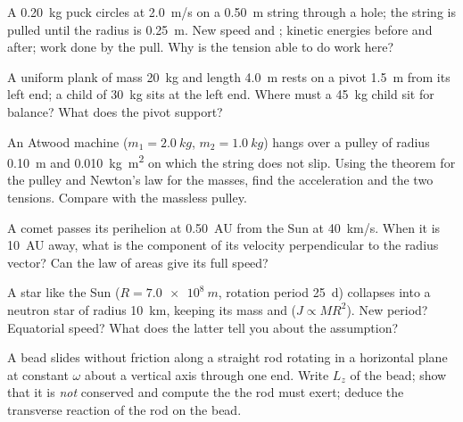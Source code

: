 \begin{exercise}[$\star\star$]\label{exo:b1:angular-momentum:7}
A \qty{0.20}{kg} puck circles at \qty{2.0}{m/s} on a \qty{0.50}{m} string
through a hole; the string is pulled until the radius is \qty{0.25}{m}.
New speed and ; kinetic energies before and after; work
done by the pull. Why is the tension able to do work here?
\end{exercise}

\begin{exercise}[$\star\star$]\label{exo:b1:angular-momentum:8}
A uniform plank of mass \qty{20}{kg} and length \qty{4.0}{m} rests on a
pivot \qty{1.5}{m} from its left end; a child of \qty{30}{kg} sits at
the left end. Where must a \qty{45}{kg} child sit for balance? What does
the pivot support?
\end{exercise}

\begin{exercise}[$\star\star$]\label{exo:b1:angular-momentum:9}
An Atwood machine ($m_1 = \qty{2.0}{kg}$, $m_2 = \qty{1.0}{kg}$) hangs over
a pulley of radius \qty{0.10}{m} and  \qty{0.010}{kg.m^2}
on which the string does not slip. Using the  theorem
for the pulley and Newton's law for the masses, find the acceleration
and the two tensions. Compare with the massless pulley.
\end{exercise}

\begin{exercise}[$\star\star\star$]\label{exo:b1:angular-momentum:10}
A comet passes its perihelion at \qty{0.50}{AU} from the Sun at
\qty{40}{km/s}. When it is \qty{10}{AU} away, what is the component of
its velocity perpendicular to the radius vector? Can the law of areas
give its full speed?
\end{exercise}

\begin{exercise}[$\star\star\star$]\label{exo:b1:angular-momentum:11}
A star like the Sun ($R = \qty{7.0e8}{m}$, rotation period \qty{25}{d})
collapses into a neutron star of radius \qty{10}{km}, keeping its mass
and  ($J \propto MR^2$). New period? Equatorial speed?
What does the latter tell you about the assumption?
\end{exercise}

\begin{exercise}[$\star\star\star$]\label{exo:b1:angular-momentum:12}
A bead slides without friction along a straight rod rotating in a
horizontal plane at constant $\omega$ about a vertical axis through one
end. Write $L_z$ of the bead; show that it is \emph{not} conserved and
compute the  the rod must exert; deduce the transverse reaction
of the rod on the bead.
\end{exercise}

